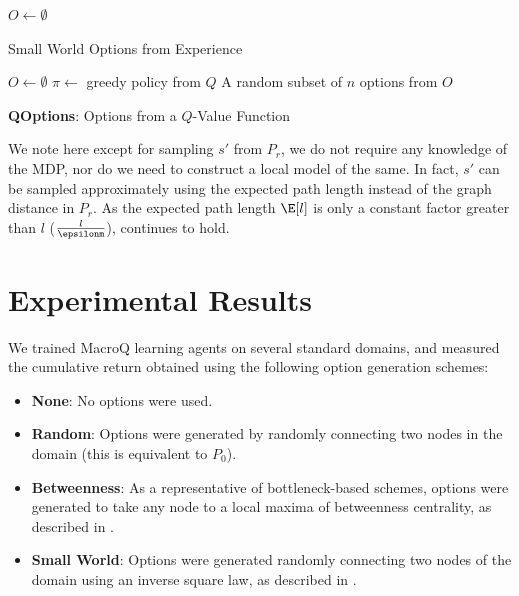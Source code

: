 \begin{algorithm}[ht]
  \DontPrintSemicolon

  $O \gets \emptyset$ \;
  \caption{Small World Options from Experience}
  \label{algo:small-world-experience}
\end{algorithm}

\begin{algorithm}[H]
  \DontPrintSemicolon
  $O \gets \emptyset$ \;
  $\pi \gets $ greedy policy from $Q$ \;
  \Return A random subset of $n$ options from $O$
  \caption{{\bf QOptions}: Options from a $Q$-Value Function}
  \label{algo:qoptions}
\end{algorithm}

We note here except for sampling $s'$ from $P_r$, we do not require any
knowledge of the MDP, nor do we need to construct a local model of the
same. In fact, $s'$ can be sampled approximately using the expected path
length instead of the graph distance in $P_r$. As the expected path
length $\E[l]$ is only a constant factor greater than $l$
($\frac{l}{\epsilonm }$),  continues to hold.

\section{Experimental Results}
\label{sec:sw:experiments}

We trained MacroQ learning agents on several standard domains, and
measured the cumulative return obtained using the following option
generation schemes: 
\begin{itemize}
   \item \textbf{None}: No options were used.
   \item \textbf{Random}: Options were generated by randomly connecting
     two nodes in the domain (this is equivalent to $P_0$).
   \item \textbf{Betweenness}: As a representative of bottleneck-based
     schemes, options were generated to take any node to a local maxima
     of betweenness centrality, as described in \cite{Simsek2008}. 
   \item \textbf{Small World}: Options were generated randomly
     connecting two nodes of the domain using an inverse square law, as
     described in .
\end{itemize}


